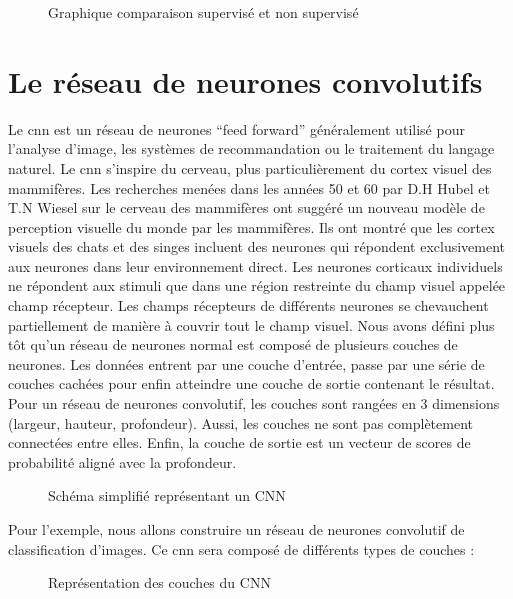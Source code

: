 \documentclass[debug,nodate,hideweeklyreports]{polytech/polytech}
\begin{document}
\begin{figure}
  \caption{Graphique comparaison supervisé et non supervisé}
  \label{fig:superunsuper}
\end{figure}

\section{Le réseau de neurones convolutifs}

Le \gls{cnn} est un réseau de neurones “feed forward” généralement utilisé pour l’analyse d’image, les systèmes de recommandation ou le traitement du langage naturel.
Le \gls{cnn} s’inspire du cerveau, plus particulièrement du cortex visuel des mammifères. Les recherches menées dans les années 50 et 60 par D.H Hubel et T.N Wiesel sur le cerveau des mammifères ont suggéré un nouveau modèle de perception visuelle du monde par les mammifères. Ils ont montré que les cortex visuels des chats et des singes incluent des neurones qui répondent exclusivement aux neurones dans leur environnement direct. Les neurones corticaux individuels ne répondent aux stimuli que dans une région restreinte du champ visuel appelée champ récepteur. Les champs récepteurs de différents neurones se chevauchent partiellement de manière à couvrir tout le champ visuel.
Nous avons défini plus tôt qu’un réseau de neurones normal est composé de plusieurs couches de neurones. Les données entrent par une couche d’entrée, passe par une série de couches cachées pour enfin atteindre une couche de sortie contenant le résultat. Pour un réseau de neurones convolutif, les couches sont rangées en 3 dimensions (largeur, hauteur, profondeur). Aussi, les couches ne sont pas complètement connectées entre elles. Enfin, la couche de sortie est un vecteur de scores de probabilité aligné avec la profondeur.

\begin{figure}
  \caption{Schéma simplifié représentant un CNN}
  \label{fig:cnnsimple}
\end{figure}

Pour l’exemple, nous allons construire un réseau de neurones convolutif de classification d’images.
Ce \gls{cnn} sera composé de différents types de couches :

\begin{figure}
  \caption{Représentation des couches du CNN}
  \label{fig:cnnlayers}
\end{figure}
\end{document}
